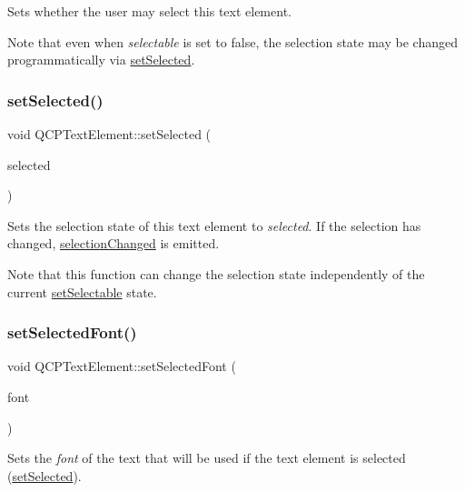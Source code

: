 Sets whether the user may select this text element.

Note that even when {\itshape selectable} is set to {\ttfamily false}, the selection state may be changed programmatically via \hyperlink{classQCPTextElement_aba5521f9fb22a5f3d2f09ab37d4a1751}{set\+Selected}. \mbox{\label{classQCPTextElement_aba5521f9fb22a5f3d2f09ab37d4a1751}} 
\subsubsection{\texorpdfstring{set\+Selected()}{setSelected()}}
{\footnotesize\ttfamily void Q\+C\+P\+Text\+Element\+::set\+Selected (\begin{DoxyParamCaption}\item[{bool}]{selected }\end{DoxyParamCaption})}

Sets the selection state of this text element to {\itshape selected}. If the selection has changed, \hyperlink{classQCPTextElement_a49f45b87ee9c1fe866c2cdd12af17a9a}{selection\+Changed} is emitted.

Note that this function can change the selection state independently of the current \hyperlink{classQCPTextElement_a3c5f9b1897a036b16495ed3fb8371c55}{set\+Selectable} state. \mbox{\label{classQCPTextElement_a0a2397a3c4ede519e16ab3e991904065}} 
\subsubsection{\texorpdfstring{set\+Selected\+Font()}{setSelectedFont()}}
{\footnotesize\ttfamily void Q\+C\+P\+Text\+Element\+::set\+Selected\+Font (\begin{DoxyParamCaption}\item[{const Q\+Font \&}]{font }\end{DoxyParamCaption})}

Sets the {\itshape font} of the text that will be used if the text element is selected (\hyperlink{classQCPTextElement_aba5521f9fb22a5f3d2f09ab37d4a1751}{set\+Selected}).

